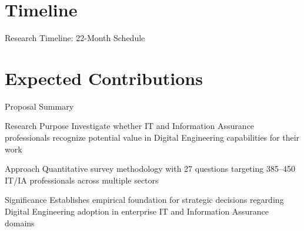 \documentclass{beamer}
\begin{document}
\section{Timeline}
\begin{frame}[allowframebreaks]{Research Timeline: 22-Month Schedule}
  \begin{center}
    \noindent{}
  \end{center}
\end{frame}

\section{Expected Contributions}
\begin{frame}[allowframebreaks]{Proposal Summary}
  \begin{block}{Research Purpose}
    Investigate whether IT and Information Assurance professionals recognize potential value in Digital Engineering capabilities for their work
  \end{block}

  \begin{block}{Approach}
    Quantitative survey methodology with 27 questions targeting 385--450 IT/IA professionals across multiple sectors
  \end{block}

  \begin{block}{Significance}
    Establishes empirical foundation for strategic decisions regarding Digital Engineering adoption in enterprise IT and Information Assurance domains
  \end{block}
\end{frame}
\end{document}
